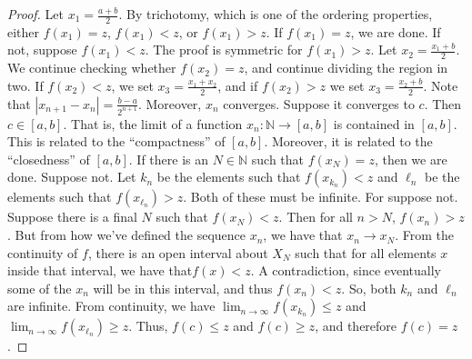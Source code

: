 \documentclass[crop=false,class=book,oneside]{standalone}
\begin{document}
            \begin{proof}
                    Let $x_{1}=\frac{a+b}{2}$. By trichotomy,
                    which is one of the ordering properties, either
                    $f(x_{1})=z$, $f(x_{1})<z$, or $f(x_{1})>z$. If
                    $f(x_{1})=z$, we are done. If not, suppose
                    $f(x_{1})<z$. The proof is symmetric for
                    $f(x_{1})>z$. Let $x_{2}=\frac{x_{1}+b}{2}$.
                    We continue checking whether $f(x_{2})=z$,
                    and continue dividing the region in two.
                    If $f(x_{2})<z$,  we set
                    $x_{3}=\frac{x_{1}+x_{2}}{2}$, and if
                    $f(x_{2})>z$ we set $x_{3}=\frac{x_{2}+b}{2}$.
                    Note that $|x_{n+1}-x_{n}|=\frac{b-a}{2^{n+1}}$.
                    Moreover, $x_{n}$ converges. Suppose it
                    converges to $c$. Then $c\in[a,b]$. That is,
                    the limit of a function
                    $x_{n}:\mathbb{N}\rightarrow[a,b]$ is
                    contained in $[a,b]$. This is related to the
                    ``compactness'' of $[a,b]$. Moreover, it is
                    related to the ``closedness'' of $[a,b]$.
                    If there is an $N\in\mathbb{N}$ such that
                    $f(x_{N})=z$, then we are
                    done. Suppose not. Let $k_{n}$ be the
                    elements such that $f(x_{k_{n}})<z$ and
                    $\ell_{n}$ be the elements such that
                    $f(x_{\ell_{n}})>z$. Both of these must be
                    infinite. For suppose not.
                    Suppose there is a final $N$ such that
                    $f(x_{N})<z$. Then for all $n>N$, $f(x_{n})>z$.
                    But from how we've defined the sequence $x_{n}$,
                    we have that $x_{n}\rightarrow{x_{N}}$.
                    From the continuity of $f$, there is an open
                    interval about $X_{N}$ such that for all
                    elements $x$ inside that interval, we have
                    that$f(x)<z$. A contradiction, since eventually
                    some of the $x_{n}$ will be in this interval,
                    and thus $f(x_{n})<z$. So, both $k_{n}$
                    and $\ell_{n}$ are
                    infinite. From continuity, we have
                    $\lim_{n\rightarrow\infty}f(x_{k_{n}})\leq{z}$
                    and
                    $\lim_{n\rightarrow\infty}
                     f(x_{\ell_{n}})\geq{z}$.
                    Thus, $f(c)\leq{z}$ and $f(c)\geq{z}$,
                    and therefore $f(c)=z$.
                \end{proof}
\end{document}

